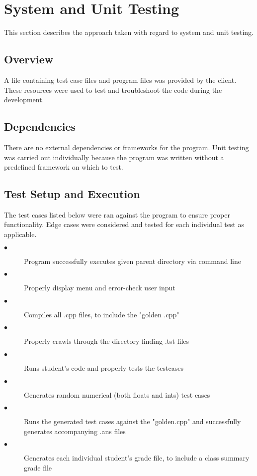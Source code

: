 
\chapter{System  and Unit Testing}

This section describes the approach taken with regard to system and unit testing. 

\section{Overview}
A file containing test case files and program files was provided by the client.  These
resources were used to test and troubleshoot the code during the development.

\section{Dependencies}
There are no external dependencies or frameworks for the program. Unit testing was carried out individually because the program was written without a predefined framework on which to test. 

\section{Test Setup and Execution}
The test cases listed below were ran against the program to ensure proper functionality.  Edge cases were considered and tested for each individual test as applicable.

\begin{description}
\item [$\bullet$] Program successfully executes given parent directory via command line
\item [$\bullet$] Properly display menu and error-check user input
\item [$\bullet$] Compiles all .cpp files, to include the "golden .cpp"
\item [$\bullet$] Properly crawls through the directory finding .tst files
\item [$\bullet$] Runs student's code and properly tests the testcases
\item [$\bullet$] Generates random numerical (both floats and ints) test cases 
\item [$\bullet$] Runs the generated test cases against the  "golden.cpp" and successfully generates accompanying .ans files
\item [$\bullet$] Generates each individual student's grade file, to include a class summary grade file
\end{description}